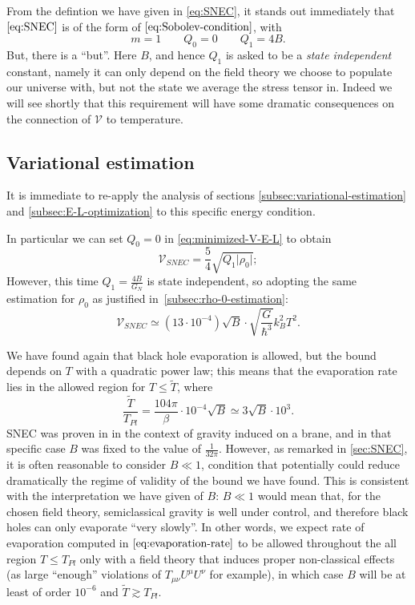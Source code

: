 From the defintion we have given in \ref{eq:SNEC}, it stands out immediately that \(\eqref{eq:SNEC}\) is of the form of \(\eqref{eq:Sobolev-condition}\), with 
\[
m = 1 \quad \quad Q_0 = 0 \quad \quad Q_1 = 4B.	
\]
But, there is a ``but''. Here \(B\), and hence \(Q_1\) is asked to be a \emph{state independent} constant, namely it can only depend on the field theory we choose to populate our universe with, but not the state we average the stress tensor in. 
Indeed we will see shortly that this requirement will have some dramatic consequences on the connection of \(\mathcal{V}\) to temperature.

\subsection{Variational estimation}
It is immediate to re-apply the analysis of sections \ref{subsec:variational-estimation} and \ref{subsec:E-L-optimization} to this specific energy condition.

In particular we can set \(Q_0 = 0\) in \eqref{eq:minimized-V-E-L} to obtain
\[
	\mathcal{V}_{SNEC} = \frac{5}{4}\sqrt{Q_1\vert\rho_0\vert};
\]
However, this time \(Q_1 = \frac{4B}{G_N}\) is state independent, so adopting the same estimation for \(\rho_0\) as justified in~\ref{subsec:rho-0-estimation}:
\[
\mathcal{V}_{SNEC} \simeq (13\cdot 10^{- 4})\sqrt{B} \cdot \sqrt{\frac{G}{\hbar^3}}k_B^2T^2.	
\] 

We have found again that black hole evaporation is allowed, but the bound depends on \(T\) with a quadratic power law; this means that the evaporation rate lies in the allowed region for \(T \le \tilde{T}\), where
\[
\frac{\tilde{T}}{T_{Pl}} = \frac{104\pi}{\beta}\cdot 10^{-4}\sqrt{B} \simeq 3\sqrt{B} \cdot 10^3.
\]
SNEC was proven in \cite{leichenauer2019upper} in the context of gravity induced on a brane, and in that specific case \(B\) was fixed to the value of \(\frac{1}{32\pi}\). However, as remarked in \ref{sec:SNEC}, it is often reasonable to consider \(B\ll 1\), condition that potentially could reduce dramatically the regime of validity of the bound we have found. This is consistent with the interpretation we have given of \(B\): \(B \ll 1\) would mean that, for the chosen field theory, semiclassical gravity is well under control, and therefore black holes can only evaporate ``very slowly''. 
\noindent
In other words, we expect rate of evaporation computed in \(\eqref{eq:evaporation-rate}\) to be allowed throughout the all region \(T\le T_{Pl}\) only with a field theory that induces proper non-classical effects (as large ``enough'' violations of \(T_{\mu\nu}U^{\mu}U^{\nu}\) for example), in which case \(B\) will be at least of order \(10^{-6}\) and \(\tilde{T} \gtrsim T_{Pl}\).

